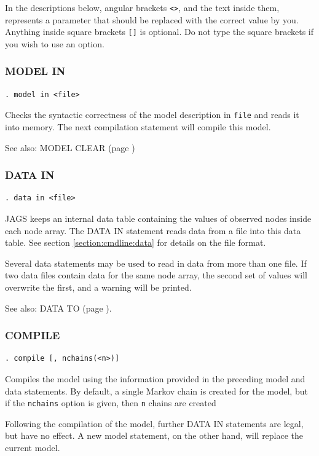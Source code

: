 \documentclass[11pt, a4paper, titlepage]{report}
\begin{document}
In the descriptions below, angular brackets \verb+<>+, and the text
inside them, represents a parameter that should be replaced with the
correct value by you.  Anything inside square brackets \verb+[]+ is
optional. Do not type the square brackets if you wish to use an
option.

\subsubsection{MODEL IN}

\begin{verbatim}
. model in <file>
\end{verbatim}
Checks the syntactic correctness of the model description in
\texttt{file} and reads it into memory. The next compilation
statement will compile this model. 

See also: MODEL CLEAR (page \pageref{model:clear})

\subsubsection{DATA IN}
\label{data:in}

\begin{verbatim}
. data in <file>
\end{verbatim}
JAGS keeps an internal data table containing the values of observed
nodes inside each node array.  The DATA IN statement reads data from a
file into this data table. See section \ref{section:cmdline:data} for
details on the file format.

Several data statements may be used to read in data from more than one
file. If two data files contain data for the same node array, the second
set of values will overwrite the first, and a warning will be printed.

See also: DATA TO (page \pageref{data:to}).

\subsubsection{COMPILE}

\begin{verbatim}
. compile [, nchains(<n>)]
\end{verbatim}
Compiles the model using the information provided in the preceding
model and data statements. By default, a single Markov chain is
created for the model, but if the \texttt{nchains} option is given,
then \texttt{n} chains are created 

Following the compilation of the model, further DATA IN statements are
legal, but have no effect.  A new model statement, on the other hand,
will replace the current model.
\end{document}
